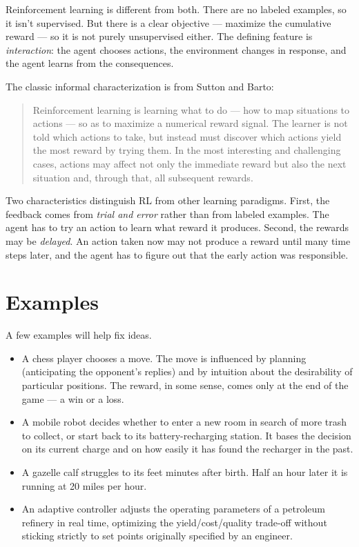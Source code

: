 \documentclass[../../book.tex]{subfiles}
\begin{document}
Reinforcement learning is different from both.  There are no labeled examples, so it isn't supervised.  But there is a clear objective --- maximize the cumulative reward --- so it is not purely unsupervised either.  The defining feature is \emph{interaction}: the agent chooses actions, the environment changes in response, and the agent learns from the consequences.

The classic informal characterization is from Sutton and Barto:

\begin{quote}
Reinforcement learning is learning what to do --- how to map situations to actions --- so as to maximize a numerical reward signal. The learner is not told which actions to take, but instead must discover which actions yield the most reward by trying them. In the most interesting and challenging cases, actions may affect not only the immediate reward but also the next situation and, through that, all subsequent rewards.
\end{quote}

Two characteristics distinguish RL from other learning paradigms.  First, the feedback comes from \emph{trial and error} rather than from labeled examples.  The agent has to try an action to learn what reward it produces.  Second, the rewards may be \emph{delayed}.  An action taken now may not produce a reward until many time steps later, and the agent has to figure out that the early action was responsible.

\section{Examples}

A few examples will help fix ideas.

\begin{itemize}
    \item A chess player chooses a move.  The move is influenced by planning (anticipating the opponent's replies) and by intuition about the desirability of particular positions.  The reward, in some sense, comes only at the end of the game --- a win or a loss.

    \item A mobile robot decides whether to enter a new room in search of more trash to collect, or start back to its battery-recharging station.  It bases the decision on its current charge and on how easily it has found the recharger in the past.

    \item A gazelle calf struggles to its feet minutes after birth.  Half an hour later it is running at 20 miles per hour.

    \item An adaptive controller adjusts the operating parameters of a petroleum refinery in real time, optimizing the yield/cost/quality trade-off without sticking strictly to set points originally specified by an engineer.
\end{itemize}
\end{document}
